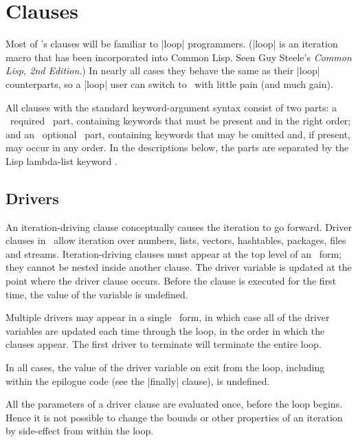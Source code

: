 \section{Clauses}

Most of \iter's clauses will be familiar to |loop| programmers.  
(|loop| is an iteration macro that has been incorporated into Common
Lisp.  Seen Guy Steele's {\em Common Lisp, 2nd Edition}.)
In
nearly all cases they behave the same as their |loop| counterparts, so
a |loop| user can switch to \iter\ with little pain (and much gain).

All clauses with the standard keyword-argument syntax consist of two
parts: a ~required~ part, 
containing keywords that must be present and in the right order; and
an ~optional~ part, containing keywords that may be omitted and,
if present, may occur in any order.  In the descriptions below, the
parts are separated by the Lisp lambda-list keyword \opt.


\subsection{Drivers}

An iteration-driving clause
conceptually causes the iteration to go forward.  Driver clauses in
\iter\ allow iteration over numbers, lists, vectors, hashtables, packages,
files and streams.  Iteration-driving clauses must
appear at the top level of an \iter\ form; they cannot be nested
inside another clause.  The driver variable is updated at the point
where the driver clause occurs.  Before the clause is executed for the
first time, the value of the variable is undefined.


Multiple drivers may appear in a single \iter\ form, in which case all
of the driver variables are updated each time through the loop, in the
order in which the clauses appear.  The first driver to terminate will
terminate the entire loop.

In all cases, the value of the driver variable on exit from the loop,
including within the epilogue code (see the |finally| clause), is
undefined.

All the parameters of a driver clause are evaluated once, before the
loop begins.  Hence it is not possible to change the bounds or other
properties of an iteration by side-effect from within the loop.

